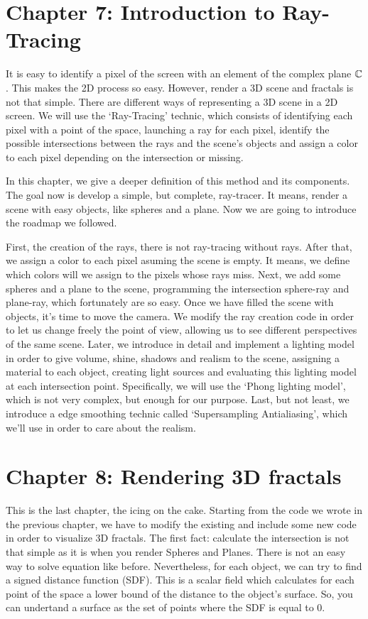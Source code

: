 \section*{Chapter 7: Introduction to Ray-Tracing}

It is easy to identify a pixel of the screen with an element of the complex plane $\mathbb{C}$. This makes the 2D process so easy. However, render a 3D scene and fractals is not that simple. There are different ways of representing a 3D scene in a 2D screen. We will use the `Ray-Tracing' technic, which consists of identifying each pixel with a point of the space, launching a ray for each pixel, identify the possible intersections between the rays and the scene's objects and assign a color to each pixel depending on the intersection or missing.

In this chapter, we give a deeper definition of this method and its components. The goal now is develop a simple, but complete, ray-tracer. It means, render a scene with easy objects, like spheres and a plane. Now we are going to introduce the roadmap we followed.

First, the creation of the rays, there is not ray-tracing without rays. After that, we assign a color to each pixel asuming the scene is empty. It means, we define which colors will we assign to the pixels whose rays miss. Next, we add some spheres and a plane to the scene, programming the intersection sphere-ray and plane-ray, which fortunately are so easy. Once we have filled the scene with objects, it's time to move the camera. We modify the ray creation code in order to let us change freely the point of view, allowing us to see different perspectives of the same scene. Later, we introduce in detail and implement a lighting model in order to give volume, shine, shadows and realism to the scene, assigning a material to each object, creating light sources and evaluating this lighting model at each intersection point. Specifically, we will use the `Phong lighting model', which is not very complex, but enough for our purpose. Last, but not least, we introduce a edge smoothing technic called `Supersampling Antialiasing', which we'll use in order to care about the realism.

\section*{Chapter 8: Rendering 3D fractals}

This is the last chapter, the icing on the cake. Starting from the code we wrote in the previous chapter, we have to modify the existing and include some new code in order to visualize 3D fractals. The first fact: calculate the intersection is not that simple as it is when you render Spheres and Planes. There is not an easy way to solve equation like before. Nevertheless, for each object, we can try to find a signed distance function (SDF). This is a scalar field which calculates for each point of the space a lower bound of the distance to the object's surface. So, you can undertand a surface as the set of points where the SDF is equal to 0.

